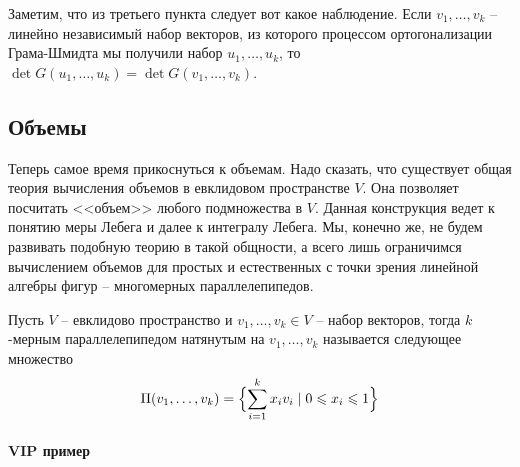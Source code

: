 Заметим, что из третьего пункта следует вот какое наблюдение. Если $v_1,\ldots, v_k$ -- линейно независимый набор векторов, из которого процессом ортогонализации Грама-Шмидта мы получили набор $u_1,\ldots,u_k$, то $\det G(u_1,\ldots,u_k) = \det G(v_1,\ldots,v_k)$.

\subsection{Объемы}

Теперь самое время прикоснуться к объемам. Надо сказать, что существует общая теория вычисления объемов в евклидовом пространстве $V$. Она позволяет посчитать <<объем>> любого подмножества в $V$. Данная конструкция ведет к понятию меры Лебега и далее к интегралу Лебега. Мы, конечно же, не будем развивать подобную теорию в такой общности, а всего лишь ограничимся вычислением объемов для простых и естественных с точки зрения линейной алгебры фигур -- многомерных параллелепипедов.

\begin{definition}
Пусть $V$ -- евклидово пространство и $v_1,\ldots,v_k\in V$ -- набор векторов, тогда $k$-мерным параллелепипедом натянутым на $v_1,\ldots,v_k$ называется следующее множество
\[
\Pi(v_1,\ldots,v_k) = \Bigl\{\sum_{i=1}^k x_i v_i\mid 0\leqslant x_i \leqslant 1\Bigl\}
\]
\end{definition}

\paragraph{VIP пример}

